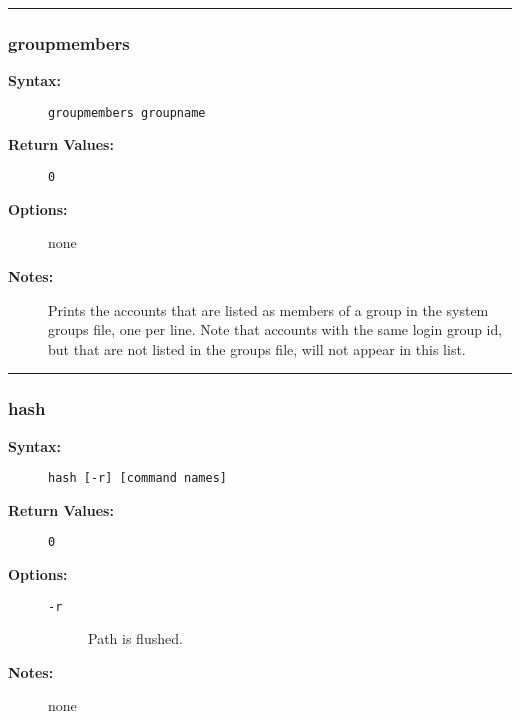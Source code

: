 \hrule
\subsubsection{groupmembers}

\begin{description}
\item[{\bf Syntax:}] \mbox{}

{\tt groupmembers groupname}

\item[{\bf Return Values:}] \mbox{}

\begin{description}
\item[{\tt 0}] \mbox{}



\end{description}


\item[{\bf Options:}] \mbox{}

none  

\item[{\bf Notes:}] \mbox{}

Prints the accounts that are listed as 
members of a group in the system groups file, one per line.
Note that accounts with the same login group id, but that are 
not listed in the groups file, will not appear in this list.

\end{description}


\hrule
\subsubsection{hash}

\begin{description}
\item[{\bf Syntax:}] \mbox{}

{\tt hash [-r] [command names]}

\item[{\bf Return Values:}] \mbox{}

\begin{description}
\item[{\tt 0}] \mbox{}



\end{description}


\item[{\bf Options:}] \mbox{}

\begin{description}
\item[{\tt -r}] \mbox{}

Path is flushed.

\end{description}


\item[{\bf Notes:}] \mbox{}

none  

\end{description}


